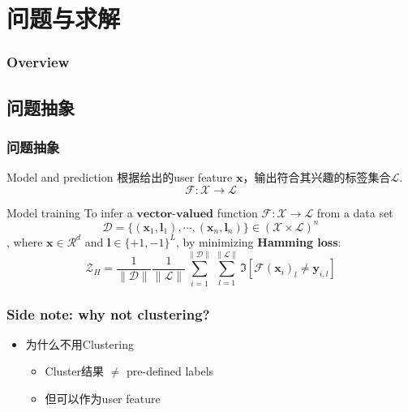 \documentclass{beamer}
\begin{document}
\section{问题与求解}

\begin{frame}
\frametitle{Overview} %
\tableofcontents[currentsection] %
\end{frame}

\subsection{问题抽象}

\begin{frame}
\frametitle{问题抽象}
\begin{block}{Model and prediction}
根据给出的user feature $\mathbf{x}$，输出符合其兴趣的标签集合$\mathcal{L}$.
$$\mathcal{F} : \mathcal{X} \rightarrow \mathcal{L}$$
\end{block}

\pause

\begin{block}{Model training}
To infer a $\textbf{vector-valued}$ function $\mathcal{F} : \mathcal{X} \rightarrow \mathcal{L}$ from a data set
$$\mathcal{D} = \{({\mathbf{x}}_1, {\mathbf{l}}_1), \cdots, ({\mathbf{x}}_n, {\mathbf{l}}_n)\} \in (\mathcal{X} \times \mathcal{L})^n$$
, where $\mathbf{x} \in \mathcal{R}^d$ and $\mathbf{l} \in {\{+1,-1\}}^L$, by minimizing \textbf{Hamming loss}:
$$\mathcal{Z}_{H} = \frac{1}{\|\mathcal{D}\|} \frac{1}{\|\mathcal{L}\|} \sum_{i=1}^{\|\mathcal{D}\|} \sum_{l=1}^{\|\mathcal{L}\|} \mathfrak{I} [ \mathcal{F}(\mathbf{x}_i)_l \neq \mathbf{y}_{i,l} ]$$
\end{block}
\end{frame}

\begin{frame}
\frametitle{Side note: why not clustering?}

\begin{itemize}
\item 为什么不用Clustering
  \begin{itemize}
    \item Cluster结果 $\neq$  pre-defined labels
    \item 但可以作为user feature
  \end{itemize}
\end{itemize}
\end{frame}
\end{document}
